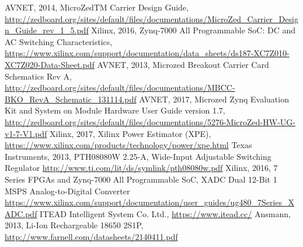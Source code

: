 \begin{thebibliography}{21} %
    AVNET, 2014, MicroZedTM Carrier Design Guide, \url{http://zedboard.org/sites/default/files/documentations/MicroZed_Carrier_Design_Guide_rev_1_5.pdf}
  	Xilinx, 2016, Zynq-7000 All Programmable SoC: DC and AC Switching Characteristics, \url{https://www.xilinx.com/support/documentation/data_sheets/ds187-XC7Z010-XC7Z020-Data-Sheet.pdf}
  	AVNET, 2013, Microzed Breakout Carrier Card Schematics Rev A, \url{http://zedboard.org/sites/default/files/documentations/MBCC-BKO_RevA_Schematic_131114.pdf}
  	AVNET, 2017, Microzed Zynq Evaluation Kit and System on Module Hardware User Guide version 1.7, \url{http://zedboard.org/sites/default/files/documentations/5276-MicroZed-HW-UG-v1-7-V1.pdf}
  	Xilinx, 2017, Xilinx Power Estimator (XPE), \url{https://www.xilinx.com/products/technology/power/xpe.html}
  	Texas Instruments, 2013, PTH08080W 2.25-A, Wide-Input Adjustable Switching Regulator \url{http://www.ti.com/lit/ds/symlink/pth08080w.pdf}
    Xilinx, 2016, 7 Series FPGAs and Zynq-7000 All Programmable SoC, XADC Dual 12-Bit 1 MSPS Analog-to-Digital Converter \url{https://www.xilinx.com/support/documentation/user_guides/ug480_7Series_XADC.pdf}
    ITEAD Intelligent System Co. Ltd., \url{https://www.itead.cc/}
    Ansmann, 2013, Li-Ion Rechargeable 18650 2S1P, \url{http://www.farnell.com/datasheets/2140411.pdf}
\end{thebibliography}
